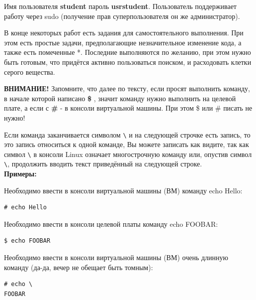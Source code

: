Имя пользователя \textbf{student} пароль \textbf{usrstudent}. Пользователь поддерживает работу через sudo (получение прав суперпользователя он же администратор).

В конце некоторых работ есть задания для самостоятельного выполнения. При этом есть простые задачи, предполагающие незначительное изменение кода, а также есть помеченные *. Последние выполняются по желанию, при этом нужно быть готовым, что придётся активно пользоваться поиском, и расходовать клетки серого вещества.

\textbf{ВНИМАНИЕ!} Запомните, что далее по тексту, если просят выполнить команду, в начале которой написано \textbf{\$} , значит команду нужно выполнить на целевой плате, а если с \textbf{\#} - в консоли виртуальной машины. При этом \$ или \# писать не нужно! 

Если команда заканчивается символом \verb!\! и на следующей строчке есть запись, то это запись относиться к одной команде, Вы можете записать как видите, так как символ \verb!\! в консоли Linux означает многострочную команду или, опустив символ \verb!\!, продолжить вводить текст приведённый на следующей строке.\\

\textbf{Примеры:}

Необходимо ввести в консоли виртуальной машины (ВМ) команду echo Hello:

\begin{lstlisting}[style=bash]
# echo Hello 
\end{lstlisting}

Необходимо ввести в консоли целевой платы команду echo FOOBAR:

\begin{lstlisting}[style=bash]
$ echo FOOBAR
\end{lstlisting}

Необходимо ввести в консоли виртуальной машины (ВМ) очень длинную команду (да-да, вечер не обещает быть томным):

\begin{lstlisting}[style=bash]
# echo \
FOOBAR 
\end{lstlisting}
